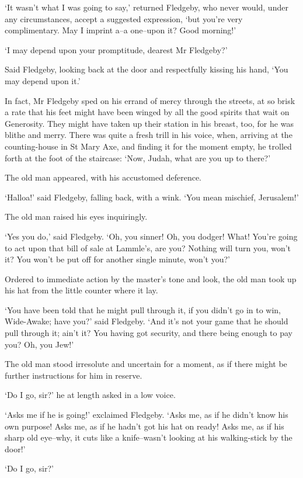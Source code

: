 ‘It wasn’t what I was going to say,’ returned Fledgeby, who never would,
under any circumstances, accept a suggested expression, ‘but you’re very
complimentary. May I imprint a--a one--upon it? Good morning!’

‘I may depend upon your promptitude, dearest Mr Fledgeby?’

Said Fledgeby, looking back at the door and respectfully kissing his
hand, ‘You may depend upon it.’

In fact, Mr Fledgeby sped on his errand of mercy through the streets,
at so brisk a rate that his feet might have been winged by all the good
spirits that wait on Generosity. They might have taken up their station
in his breast, too, for he was blithe and merry. There was quite a fresh
trill in his voice, when, arriving at the counting-house in St Mary Axe,
and finding it for the moment empty, he trolled forth at the foot of the
staircase: ‘Now, Judah, what are you up to there?’

The old man appeared, with his accustomed deference.

‘Halloa!’ said Fledgeby, falling back, with a wink. ‘You mean mischief,
Jerusalem!’

The old man raised his eyes inquiringly.

‘Yes you do,’ said Fledgeby. ‘Oh, you sinner! Oh, you dodger! What!
You’re going to act upon that bill of sale at Lammle’s, are you? Nothing
will turn you, won’t it? You won’t be put off for another single minute,
won’t you?’

Ordered to immediate action by the master’s tone and look, the old man
took up his hat from the little counter where it lay.

‘You have been told that he might pull through it, if you didn’t go in
to win, Wide-Awake; have you?’ said Fledgeby. ‘And it’s not your game
that he should pull through it; ain’t it? You having got security, and
there being enough to pay you? Oh, you Jew!’

The old man stood irresolute and uncertain for a moment, as if there
might be further instructions for him in reserve.

‘Do I go, sir?’ he at length asked in a low voice.

‘Asks me if he is going!’ exclaimed Fledgeby. ‘Asks me, as if he didn’t
know his own purpose! Asks me, as if he hadn’t got his hat on ready!
Asks me, as if his sharp old eye--why, it cuts like a knife--wasn’t
looking at his walking-stick by the door!’

‘Do I go, sir?’

